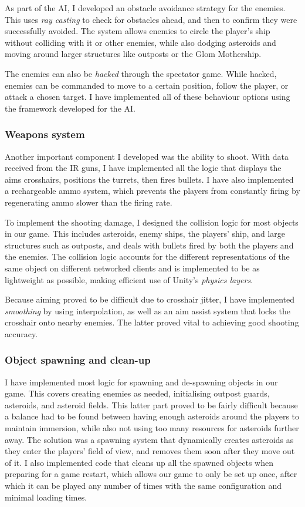 \documentclass[a4paper,11pt]{article}
\begin{document}
As part of the AI, I developed an obstacle avoidance strategy for the enemies. This uses \emph{ray casting} to check for obstacles ahead, and then to confirm they were successfully avoided. The system allows enemies to circle the player’s ship without colliding with it or other enemies, while also dodging asteroids and moving around larger structures like outposts or the Glom Mothership.

The enemies can also be \emph{hacked} through the spectator game. While hacked, enemies can be commanded to move to a certain position, follow the player, or attack a chosen target. I have implemented all of these behaviour options using the framework developed for the AI.

\subsubsection{Weapons system}

Another important component I developed was the ability to shoot. With data received from the IR guns, I have implemented all the logic that displays the aims crosshairs, positions the turrets, then fires bullets. I have also implemented a rechargeable ammo system, which prevents the players from constantly firing by regenerating ammo slower than the firing rate.

To implement the shooting damage, I designed the collision logic for most objects in our game. This includes asteroids, enemy ships, the players' ship, and large structures such as outposts, and deals with bullets fired by both the players and the enemies. The collision logic accounts for the different representations of the same object on different networked clients and is implemented to be as lightweight as possible, making efficient use of Unity's \emph{physics layers}.

Because aiming proved to be difficult due to crosshair jitter, I have implemented \emph{smoothing} by using interpolation, as well as an aim assist system that locks the crosshair onto nearby enemies. The latter proved vital to achieving good shooting accuracy.

\subsubsection{Object spawning and clean-up}

I have implemented most logic for spawning and de-spawning objects in our game. This covers creating enemies as needed, initialising outpost guards, asteroids, and asteroid fields. This latter part proved to be fairly difficult because a balance had to be found between having enough asteroids around the players to maintain immersion, while also not using too many resources for asteroids further away. The solution was a spawning system that dynamically creates asteroids as they enter the players' field of view, and removes them soon after they move out of it. I also implemented code that cleans up all the spawned objects when preparing for a game restart, which allows our game to only be set up once, after which it can be played any number of times with the same configuration and minimal loading times.
\end{document}
